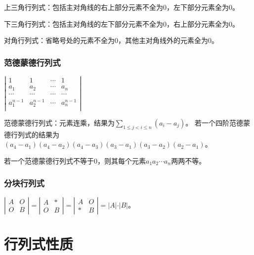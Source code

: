 \documentclass[UTF8, 12pt]{ctexart}
\begin{document}
    上三角行列式：包括主对角线的右上部分元素不全为0，左下部分元素全为0。


    下三角行列式：包括主对角线的左下部分元素不全为0，右上部分元素全为0。


    对角行列式：省略号处的元素不全为0，其他主对角线外的元素全为0。

\subsubsection{范德蒙德行列式}

\begin{multicols}{2}

    $\left|\begin{array}{cccc} 
        1 & 1 & \cdots & 1 \\
        a_1 & a_2  & \cdots & a_n \\
        \cdots & \cdots & \cdots & \cdots \\
        a_1^{n-1} & a_2^{n-1} & \cdots & a_n^{n-1} \\
    \end{array}\right|$

    范德蒙德行列式：元素连乘，结果为$\sum\limits_{1\leqslant j<i\leqslant n}(a_i-a_j)$。
    若一个四阶范德蒙德行列式的结果为$(a_4-a_1)(a_4-a_2)(a_4-a_3)(a_3-a_1)(a_3-a_2)(a_2-a_1)$。

\end{multicols}

若一个范德蒙德行列式不等于0，则其每个元素$a_1a_2\cdots a_n$两两不等。

\subsubsection{分块行列式}

$\left|\begin{array}{cc}
    A & O \\
    O & B
\end{array}\right|=
\left|\begin{array}{cc}
    A & * \\
    O & B
\end{array}\right|=
\left|\begin{array}{cc}
    A & O \\
    * & B
\end{array}\right|=\vert A\vert\cdot\vert B\vert$。

\section{行列式性质}
\end{document}
